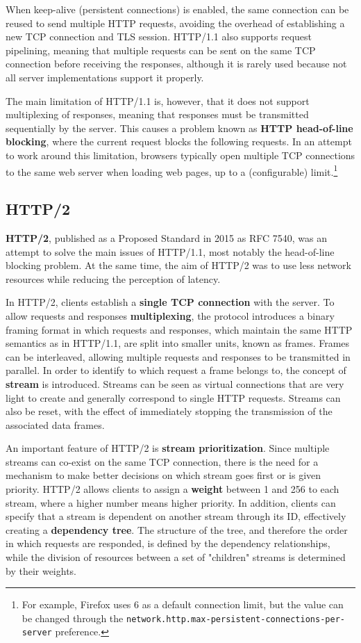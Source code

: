 When keep-alive (persistent connections) is enabled, the same connection can be reused to send multiple HTTP requests, avoiding the overhead of establishing a new TCP connection and TLS session. HTTP/1.1 also supports request pipelining, meaning that multiple requests can be sent on the same TCP connection before receiving the responses, although it is rarely used because not all server implementations support it properly.

The main limitation of HTTP/1.1 is, however, that it does not support multiplexing of responses, meaning that responses must be transmitted sequentially by the server. This causes a problem known as \textbf{HTTP head-of-line blocking}, where the current request blocks the following requests. In an attempt to work around this limitation, browsers typically open multiple TCP connections to the same web server when loading web pages, up to a (configurable) limit.\footnote{For example, Firefox uses 6 as a default connection limit, but the value can be changed through the \texttt{network.http.max-persistent-connections-per-server} preference.} 

\subsection{HTTP/2}
\label{sec:bg/http2}

\textbf{HTTP/2}, published as a Proposed Standard in 2015 as RFC 7540, was an attempt to solve the main issues of HTTP/1.1, most notably the head-of-line blocking problem. At the same time, the aim of HTTP/2 was to use less network resources while reducing the perception of latency.\cite{http2}

In HTTP/2, clients establish a \textbf{single TCP connection} with the server. To allow requests and responses \textbf{multiplexing}, the protocol introduces a binary framing format in which requests and responses, which maintain the same HTTP semantics as in HTTP/1.1, are split into smaller units, known as frames. Frames can be interleaved, allowing multiple requests and responses to be transmitted in parallel. In order to identify to which request a frame belongs to, the concept of \textbf{stream} is introduced. Streams can be seen as virtual connections that are very light to create and generally correspond to single HTTP requests. Streams can also be reset, with the effect of immediately stopping the transmission of the associated data frames.

An important feature of HTTP/2 is \textbf{stream prioritization}. Since multiple streams can co-exist on the same TCP connection, there is the need for a mechanism to make better decisions on which stream goes first or is given priority. HTTP/2 allows clients to assign a \textbf{weight} between 1 and 256 to each stream, where a higher number means higher priority. In addition, clients can specify that a stream is dependent on another stream through its ID, effectively creating a \textbf{dependency tree}. The structure of the tree, and therefore the order in which requests are responded, is defined by the dependency relationships, while the division of resources between a set of "children" streams is determined by their weights.

